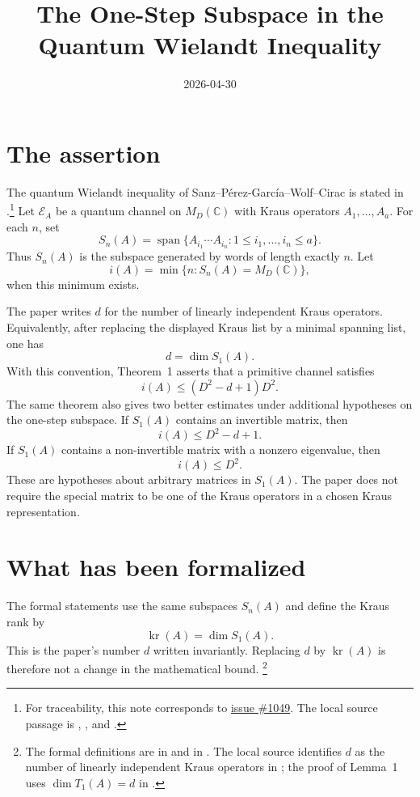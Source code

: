 \documentclass{article}
\title{The One-Step Subspace in the Quantum Wielandt Inequality}
\author{}
\date{2026-04-30}
\begin{document}
\maketitle

\section{The assertion}

The quantum Wielandt inequality of Sanz--P\'erez-Garc\'ia--Wolf--Cirac is
stated in \cite[Theorem~1]{Sanz2010Quantum}.\footnote{For
    traceability, this note corresponds to
    \href{https://github.com/LionSR/TNLean/issues/1049}{issue \#1049}. The local
    source passage is ,
    , and
    .}
Let $\mathcal E_A$ be a quantum channel on $M_D(\mathbb C)$ with Kraus
operators $A_1,\ldots,A_a$. For each $n$, set
\[
    S_n(A)=\operatorname{span}\{A_{i_1}\cdots A_{i_n}:1\leq i_1,\ldots,i_n\leq a\}.
\]
Thus $S_n(A)$ is the subspace generated by words of length exactly $n$. Let
\[
    i(A)=\min\{n:S_n(A)=M_D(\mathbb C)\},
\]
when this minimum exists.

The paper writes $d$ for the number of linearly independent Kraus operators.
Equivalently, after replacing the displayed Kraus list by a minimal spanning
list, one has
\[
    d=\dim S_1(A).
\]
With this convention, Theorem~1 asserts that a primitive channel satisfies
\[
    i(A)\leq (D^2-d+1)D^2.
\]
The same theorem also gives two better estimates under additional hypotheses
on the one-step subspace. If $S_1(A)$ contains an invertible matrix, then
\[
    i(A)\leq D^2-d+1.
\]
If $S_1(A)$ contains a non-invertible matrix with a nonzero eigenvalue, then
\[
    i(A)\leq D^2.
\]
These are hypotheses about arbitrary matrices in $S_1(A)$. The paper does not
require the special matrix to be one of the Kraus operators in a chosen Kraus
representation.

\section{What has been formalized}

The formal statements use the same subspaces $S_n(A)$ and define the Kraus
rank by
\[
    \operatorname{kr}(A)=\dim S_1(A).
\]
This is the paper's number $d$ written invariantly. Replacing $d$ by
$\operatorname{kr}(A)$ is therefore not a change in the mathematical bound.
\footnote{The formal definitions are  in
     and
     in
    . The local
    source identifies $d$ as the number of linearly independent Kraus operators in
    ; the proof of Lemma~1 uses
    $\dim T_1(A)=d$ in .}
\end{document}
